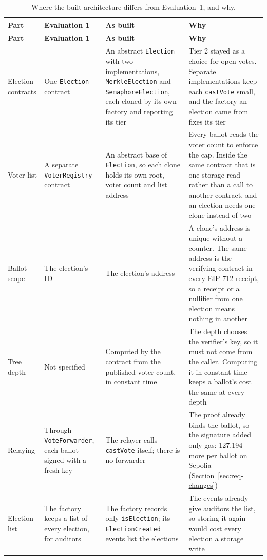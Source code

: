 \begin{longtable}{@{}>{\RaggedRight\arraybackslash\small}p{2.4cm}>{\RaggedRight\arraybackslash\small}p{3.5cm}>{\RaggedRight\arraybackslash\small}p{4.8cm}>{\RaggedRight\arraybackslash\small}p{6.4cm}@{}}
  \caption{Where the built architecture differs from Evaluation~1, and why.}\label{tab:divergences}\\
  \toprule
  \textbf{Part} & \textbf{Evaluation 1} & \textbf{As built} & \textbf{Why} \\
  \midrule
  \endfirsthead
  \toprule
  \textbf{Part} & \textbf{Evaluation 1} & \textbf{As built} & \textbf{Why} \\
  \midrule
  \endhead
  \bottomrule
  \endlastfoot
  Election contracts & One \texttt{Election} contract & An abstract \texttt{Election} with two implementations, \texttt{MerkleElection} and \texttt{SemaphoreElection}, each cloned by its own factory and reporting its tier & Tier 2 stayed as a choice for open votes. Separate implementations keep each \texttt{castVote} small, and the factory an election came from fixes its tier \\
  \addlinespace[3pt]
  Voter list & A separate \texttt{VoterRegistry} contract & An abstract base of \texttt{Election}, so each clone holds its own root, voter count and list address & Every ballot reads the voter count to enforce the cap. Inside the same contract that is one storage read rather than a call to another contract, and an election needs one clone instead of two \\
  \addlinespace[3pt]
  Ballot scope & The election's ID & The election's address & A clone's address is unique without a counter. The same address is the verifying contract in every EIP-712 receipt, so a receipt or a nullifier from one election means nothing in another \\
  \addlinespace[3pt]
  Tree depth & Not specified & Computed by the contract from the published voter count, in constant time & The depth chooses the verifier's key, so it must not come from the caller. Computing it in constant time keeps a ballot's cost the same at every depth \\
  \addlinespace[3pt]
  Relaying & Through \texttt{VoteForwarder}, each ballot signed with a fresh key & The relayer calls \texttt{castVote} itself; there is no forwarder & The proof already binds the ballot, so the signature added only gas: 127,194 more per ballot on Sepolia (Section~\ref{sec:req-changes}) \\
  \addlinespace[3pt]
  Election list & The factory keeps a list of every election, for auditors & The factory records only \texttt{isElection}; its \texttt{ElectionCreated} events list the elections & The events already give auditors the list, so storing it again would cost every election a storage write \\

\end{longtable}
